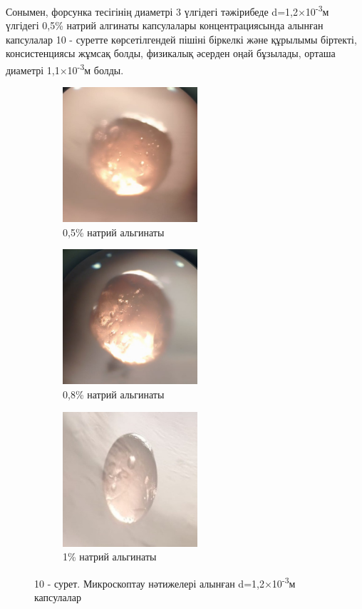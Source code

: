 Сонымен, форсунка тесігінің диаметрі 3 үлгідегі тәжірибеде
d=1,2×10\textsuperscript{-3}м үлгідегі 0,5\% натрий алгинаты капсулалары
концентрациясында алынған капсулалар 10 - суретте көрсетілгендей пішіні
біркелкі және құрылымы біртекті, консистенциясы жұмсақ болды, физикалық
әсерден оңай бұзылады, орташа диаметрі 1,1×10\textsuperscript{-3}м
болды.

\begin{figure}[H]
	\centering
	\begin{subfigure}[b]{0.3\textwidth}
		\centering
		\includegraphics[width=5cm,height=5cm]{media/pish/image41}
		\caption*{0,5\% натрий альгинаты}
	\end{subfigure}
	\hfill
	\begin{subfigure}[b]{0.3\textwidth}
		\centering
		\includegraphics[width=5cm,height=5cm]{media/pish/image42}
		\caption*{0,8\% натрий альгинаты}
	\end{subfigure}
	\hfill
	\begin{subfigure}[b]{0.3\textwidth}
		\centering
		\includegraphics[width=5cm,height=5cm]{media/pish/image43}
		\caption*{1\% натрий альгинаты}
	\end{subfigure}
	\caption*{10 - сурет. Микроскоптау нәтижелері алынған d=1,2×10\textsuperscript{-3}м капсулалар}
\end{figure}

